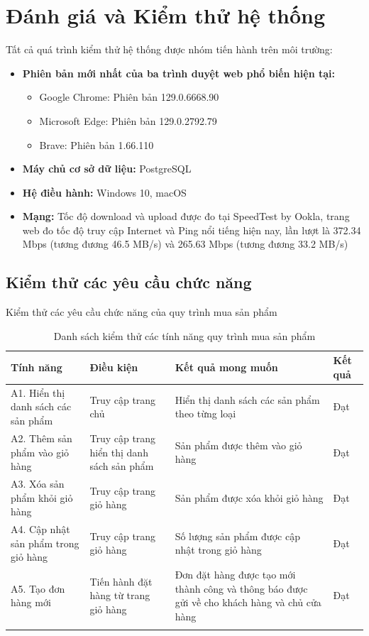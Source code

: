 \chapter{Đánh giá và Kiểm thử hệ thống}
Tất cả quá trình kiểm thử hệ thống được nhóm tiến hành trên môi trường:
\begin{itemize}
    \item \textbf{Phiên bản mới nhất của ba trình duyệt web phổ biến hiện tại:}
    \begin{itemize}
        \item Google Chrome: Phiên bản 129.0.6668.90
        \item Microsoft Edge: Phiên bản 129.0.2792.79
        \item Brave: Phiên bản 1.66.110
    \end{itemize}
    \item \textbf{Máy chủ cơ sở dữ liệu:} PostgreSQL
    \item \textbf{Hệ điều hành:} Windows 10, macOS
    \item \textbf{Mạng:} Tốc độ download và upload được đo tại SpeedTest by Ookla, trang web đo tốc độ truy cập Internet và Ping nổi tiếng hiện nay, lần lượt là 372.34 Mbps (tương đương 46.5 MB/s) và 265.63 Mbps (tương đương 33.2 MB/s)
\end{itemize}
\section{Kiểm thử các yêu cầu chức năng}

Kiểm thử các yêu cầu chức năng của quy trình mua sản phẩm
\begin{longtable}{| m{4cm} | m{4cm} | m{4cm} | m{1.5cm} |}
    \hline
    \bf Tính năng & \bf Điều kiện & \bf Kết quả mong muốn & \bf Kết quả \\ 
    \hline
    A1. Hiển thị danh sách các sản phẩm & Truy cập trang chủ & Hiển thị danh sách các sản phẩm theo từng loại & Đạt  \\ 
    \hline
    A2. Thêm sản phẩm vào giỏ hàng & Truy cập trang hiển thị danh sách sản phẩm & Sản phẩm được thêm vào giỏ hàng & Đạt \\   
    \hline
    A3. Xóa sản phẩm khỏi giỏ hàng & Truy cập trang giỏ hàng & Sản phẩm được xóa khỏi giỏ hàng & Đạt \\   
    \hline
    A4. Cập nhật sản phẩm trong giỏ hàng & Truy cập trang giỏ hàng & Số lượng sản phẩm được cập nhật trong giỏ hàng & Đạt \\   
    \hline
    A5. Tạo đơn hàng mới & Tiến hành đặt hàng từ trang giỏ hàng & Đơn đặt hàng được tạo mới thành công và thông báo được gửi về cho khách hàng và chủ cửa hàng & Đạt \\   
    \hline
    \caption{\label{demo-table} Danh sách kiểm thử các tính năng quy trình mua sản phẩm}
\end{longtable}

